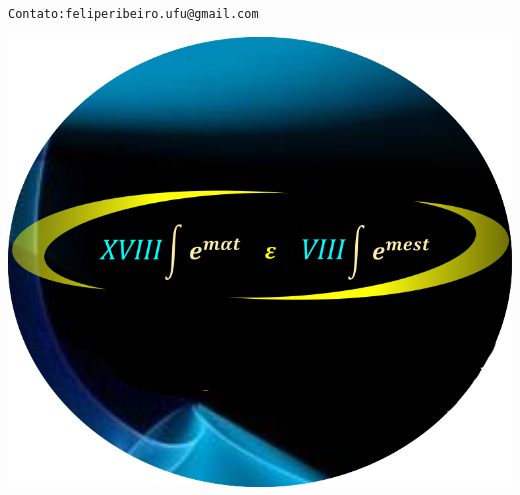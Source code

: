 \documentclass[a0,portrait]{a0poster}
\begin{document}
\begin{minipage}[c]{\linewidth}
{\begin{minipage}[c]{0.70\textwidth}
\small \texttt{Contato:feliperibeiro.ufu@gmail.com}\\
\end{minipage}
\begin{minipage}[c]{0.17\textwidth}
\vspace{0pt}\raggedleft
\includegraphics[scale=0.33]{fundologo}
\hspace{1cm}
\end{minipage}}
\\[0.1cm]%
\color{sematcolor}\setlength\FrameRule{25pt}
\begin{framed}
\vspace{0.5cm}
\begin{multicols}{2} %







\color{Black}

\end{multicols}
\end{framed}
\end{minipage}
\end{document}
